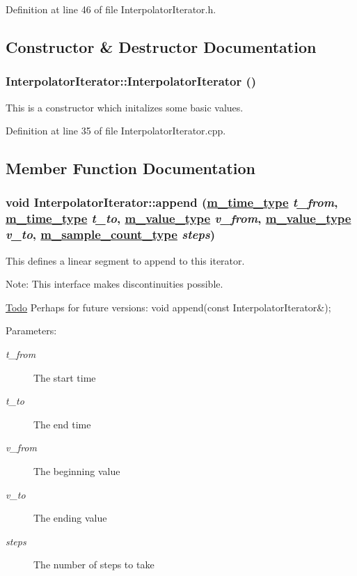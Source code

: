 Definition at line 46 of file Interpolator\-Iterator.h.

\subsection{Constructor \& Destructor Documentation}
\hypertarget{classInterpolatorIterator_a0}{
\subsubsection[InterpolatorIterator]{\setlength{\rightskip}{0pt plus 5cm}Interpolator\-Iterator::Interpolator\-Iterator ()}}
\label{classInterpolatorIterator_a0}


This is a constructor which initalizes some basic values. 

Definition at line 35 of file Interpolator\-Iterator.cpp.

\subsection{Member Function Documentation}
\hypertarget{classInterpolatorIterator_a1}{
\subsubsection[append]{\setlength{\rightskip}{0pt plus 5cm}void Interpolator\-Iterator::append (\hyperlink{Types_8h_a2}{m\_\-time\_\-type} {\em t\_\-from}, \hyperlink{Types_8h_a2}{m\_\-time\_\-type} {\em t\_\-to}, \hyperlink{Types_8h_a3}{m\_\-value\_\-type} {\em v\_\-from}, \hyperlink{Types_8h_a3}{m\_\-value\_\-type} {\em v\_\-to}, \hyperlink{Types_8h_a1}{m\_\-sample\_\-count\_\-type} {\em steps})}}
\label{classInterpolatorIterator_a1}


This defines a linear segment to append to this iterator. \begin{Desc}
\item[Note:]This interface makes discontinuities possible. \end{Desc}
\begin{Desc}
\item[\hyperlink{todo__todo000007}{Todo}]Perhaps for future versions: void append(const Interpolator\-Iterator\&);\end{Desc}
\begin{Desc}
\item[Parameters:]
\begin{description}
\item[{\em t\_\-from}]The start time \item[{\em t\_\-to}]The end time \item[{\em v\_\-from}]The beginning value \item[{\em v\_\-to}]The ending value \item[{\em steps}]The number of steps to take \end{description}
\end{Desc}


